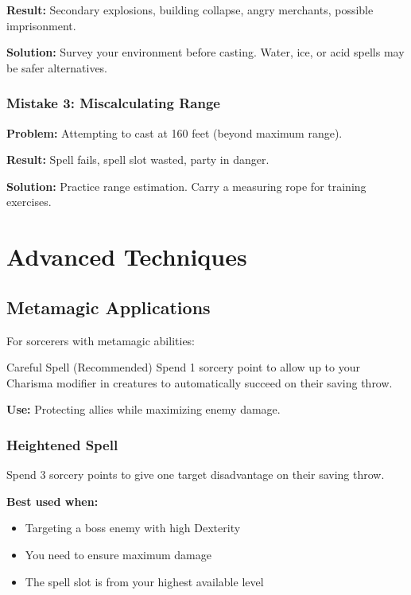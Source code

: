 \documentclass[letterpaper,twocolumn,openany]{dndbook}
\begin{document}
\textbf{Result:} Secondary explosions, building collapse, angry merchants, possible imprisonment.

\textbf{Solution:} Survey your environment before casting. Water, ice, or acid spells may be safer alternatives.

\subsection{Mistake 3: Miscalculating Range}

\textbf{Problem:} Attempting to cast at 160 feet (beyond maximum range).

\textbf{Result:} Spell fails, spell slot wasted, party in danger.

\textbf{Solution:} Practice range estimation. Carry a measuring rope for training exercises.

\chapter{Advanced Techniques}

\section{Metamagic Applications}

For sorcerers with metamagic abilities:

\begin{DndSidebar}{Careful Spell (Recommended)}
    Spend 1 sorcery point to allow up to your Charisma modifier in creatures to automatically succeed on their saving throw.

    \textbf{Use:} Protecting allies while maximizing enemy damage.
\end{DndSidebar}

\subsection{Heightened Spell}

Spend 3 sorcery points to give one target disadvantage on their saving throw.

\textbf{Best used when:}
\begin{itemize}
    \item Targeting a boss enemy with high Dexterity
    \item You need to ensure maximum damage
    \item The spell slot is from your highest available level
\end{itemize}
\end{document}
